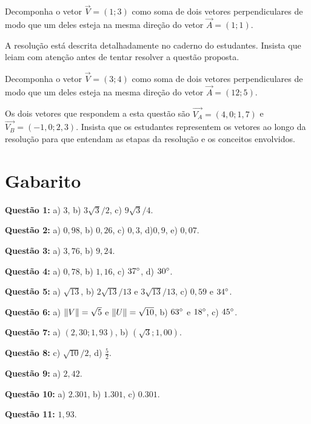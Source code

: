 \documentclass[main_estudante.tex]{subfiles}
\begin{document}
\begin{resolvida}
Decomponha o vetor $\overrightarrow{V}=(1;3)$ como soma de dois vetores perpendiculares de modo que um deles esteja na mesma direção do vetor $\overrightarrow{A}=(1;1)$.
\end{resolvida}

A resolução está descrita detalhadamente no caderno do estudantes. Insista que leiam com atenção antes de tentar resolver a questão proposta.

\begin{resolva}
Decomponha o vetor $\overrightarrow{V}=(3;4)$ como soma de dois vetores perpendiculares de modo que um deles esteja na mesma direção do vetor $\overrightarrow{A}=(12;5)$.
\end{resolva}

Os dois vetores que respondem a esta questão são $\overrightarrow{V_A}=(4,0;1,7)$ e $\overrightarrow{V_B}=(-1,0;2,3)$. Insista que os estudantes representem os vetores ao longo da resolução para que entendam as etapas da resolução e os conceitos envolvidos.

\section{Gabarito}

\noindent\textbf{Questão 1:} a) $3$, b) $3\sqrt{3}/2$, c) $9\sqrt{3}/4$.

\noindent\textbf{Questão 2:} a) $0,98$, b) $0,26$, c) $0,3$, d)$0,9$, e) $0,07$.

\noindent\textbf{Questão 3:} a) $3,76$, b) $9,24$.

\noindent\textbf{Questão 4:} a) $0,78$, b) $1,16$, c) $37\degree$, d) $30\degree$.

\noindent\textbf{Questão 5:} a) $\sqrt{13}$, b) $2\sqrt{13}/13$ e $3\sqrt{13}/13$, c) $0,59$ e $34\degree$.

\noindent\textbf{Questão 6:} a) $\Arrowvert V \Arrowvert = \sqrt{5}$ e $\Arrowvert U \Arrowvert = \sqrt{10}$, b) $63\degree$ e $18\degree$, c) $45\degree$.

\noindent\textbf{Questão 7:} a) $(2,30;1,93)$, b) $(\sqrt{3};1,00)$.

\noindent\textbf{Questão 8:} c) $\sqrt{10}/2$, d) $\frac{5}{2}$.

\noindent\textbf{Questão 9:} a) $2,42$.

\noindent\textbf{Questão 10:} a) $2.301$, b) $1.301$, c) $0.301$.

\noindent\textbf{Questão 11:} $1,93$.
\end{document}
